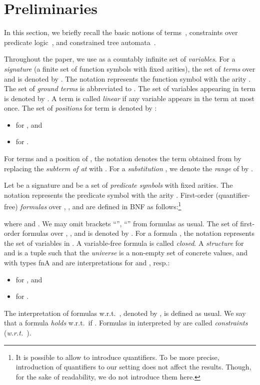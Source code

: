\documentclass[copyright,creativecommons]{eptcs}
\begin{document}
\section{Preliminaries}
\label{sec:preliminaries}

In this section, we briefly recall the basic notions of
terms~\cite{TATA}, constraints over predicate logic~\cite{Logic}, and
constrained tree automata~\cite{CTA}. 



Throughout the paper, we use  as a countably infinite set of
\emph{variables}.
For a \emph{signature}  (a finite set of function symbols with fixed
arities), the set of \emph{terms} over  and    is
denoted by .  
The notation  represents the function symbol  with the arity .
The set  of \emph{ground terms} is abbreviated to
.
The set of variables appearing in term  is denoted by .
A term is called \emph{linear} if any variable appears in the term at
most once. 
The set of \emph{positions} for term  is denoted by :
\begin{itemize}
 \item    for   , and
 \item    for  
       .
\end{itemize}
For terms  and a position  of , the notation  denotes
the term obtained from  by replacing the \emph{subterm  of 
at } with .
For a \emph{substitution} , we denote the \emph{range} of
 by . 



Let  be a signature and  be a set of \emph{predicate symbols}
with fixed arities.
The notation  represents the predicate symbol  with the arity
. 
First-order (quantifier-free) \emph{formulas}  over , , 
and  are defined in BNF as follows:\footnote{ It is possible to allow to introduce quantifiers.
To be more precise, introduction of quantifiers to our setting does not
affect the results. 
Though, for the sake of readability, we do not introduce them here. }

where    and   .
We may omit brackets ``'', ``'' from formulas as usual. 
The set of first-order formulas over , , and 
is denoted by .
For a formula , the notation  represents the set of
variables in .  
A variable-free formula is called \emph{closed}.
A \emph{structure} for  and  
is a tuple    such that the \emph{universe}
 is a non-empty set of concrete values,  and  
with types fnA and 
are interpretations for  and , resp.:
\begin{itemize}
 \item    for   , and
 \item    for   .
\end{itemize}
The interpretation of formulas  w.r.t.\ , denoted by , is defined as usual.
We say that a formula  \emph{holds} w.r.t.\  if .
Formulas in  interpreted by  are called
\emph{constraints} (\emph{w.r.t.\ }).
\end{document}
